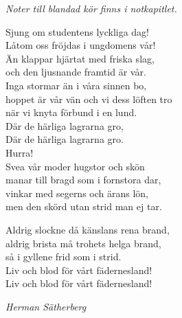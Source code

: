 \documentclass[a6paper,10pt]{article}
\begin{document}
\begin{center}
\footnotesize\textit{Noter till blandad kör finns i notkapitlet.}
\end{center}
Sjung om studentens lyckliga dag!\\
Låtom oss fröjdas i ungdomens vår!\\
Än klappar hjärtat med friska slag,\\
och den ljusnande framtid är vår.
\vspace{5pt}\\
Inga stormar än i våra sinnen bo,\\
hoppet är vår vän och vi dess löften tro\\
när vi knyta förbund i en lund.\\
Där de härliga lagrarna gro,\\
Där de härliga lagrarna gro.\\
Hurra!
\vspace{5pt}\\
Svea vår moder hugstor och skön\\
manar till bragd som i fornstora dar,\\
vinkar med segerns och ärans lön,\\
men den skörd utan strid man ej tar.

\setlength{\oddsidemargin}{-0.37in}
\noindent
Aldrig slockne då känslans rena brand,\\
aldrig brista må trohets helga brand,\\
så i gyllene frid som i strid.\\
Liv och blod för vårt fädernesland!\\
Liv och blod för vårt fädernesland!
\begin{flushright}
\textit{Herman Sätherberg}
\end{flushright}
\vspace{20pt} 
\end{document}
